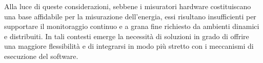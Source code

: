 Alla luce di queste considerazioni, sebbene i misuratori hardware costituiscano una base affidabile per la misurazione dell’energia, essi risultano insufficienti per
supportare il monitoraggio continuo e a grana fine richiesto da ambienti dinamici e
distribuiti.
In tali contesti emerge la necessità di soluzioni in grado di offrire una maggiore
flessibilità e di integrarsi in modo più stretto con i meccanismi di esecuzione del
software.

